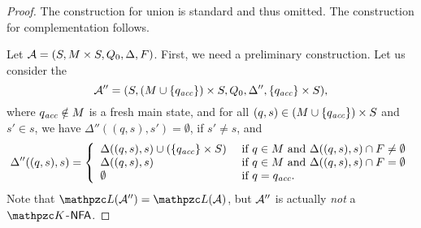 \begin{proof}     
The construction for union is standard and thus omitted. The construction for 
complementation follows.

%
%
%
%
%
Let $\mathcal{A}=( S,M\times S,Q_0,\Delta,F)$.
% 
First, we need a preliminary construction. Let us consider the \NFA\ 
\[\mathcal{A}''= (S,(M \cup \{q_{\textit{acc}}\}) \times S ,Q_{0},\Delta'',\{q_{\textit{acc}}\}\times S),\]
where $q_{\textit{acc}}\notin M$ is a fresh main state, and for all
$(q,s)\in (M \cup \{q_{\textit{acc}}\}) \times S$ and $s'\in s$, we have $\Delta''((q,s),s')=\emptyset$, if $s'\neq s$, and  %
\[%
\Delta''((q,s),s)= \left\{
    \begin{array}{ll}
     \Delta((q,s),s)\cup (\{q_\acc\}\times S)
      &    \text{ if }   q\in M \text{ and } \Delta((q,s),s)\cap F\neq \emptyset
      \\
      \Delta((q,s),s)
      &    \text{ if }   q\in M \text{ and } \Delta((q,s),s)\cap F = \emptyset
      \\
      \emptyset
      &   \text{ if }   q = q_\acc.
    \end{array}
  \right.
\]
%
Note that  $\Lang(\Au'')=\Lang(\Au)$, but $\mathcal{A}''$ is actually \emph{not} a  $\Ku$-$\text{\sffamily NFA}$.


\end{proof}
